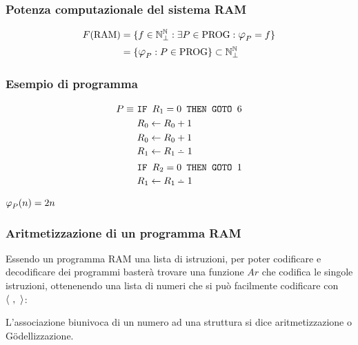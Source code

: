 \subsubsection*{Potenza computazionale del sistema RAM}
$$ \begin{aligned}
        F(\RAM) &= \{f\in\N_\perp^\N:\exists P \in \PROG: \semantica_P=f\}\\
                &= \{\semantica_P:P\in\PROG\} \subset \N_\perp^\N
\end{aligned} $$

\subsubsection*{Esempio di programma}
\vspace{-1em}
\begin{minipage}{.48\textwidth}
    \begin{align}
        P \equiv\ & \goto{R_1}{6}       \notag\\
        & R_0 \leftarrow R_0+1          \notag\\
        & R_0 \leftarrow R_0+1          \notag\\[-.3em]
        & R_1 \leftarrow R_1\dotminus 1 \notag\\
        & \goto{R_2}{1}                 \notag\\[-.3em]
        & R_1 \leftarrow R_1\dotminus 1 \notag
    \end{align}
\end{minipage}
\begin{minipage}{.48\textwidth}
    $ \semantica_P(n) = 2n $
\end{minipage}

\subsubsection*{Aritmetizzazione di un programma RAM}
Essendo un programma RAM una lista di istruzioni, per poter codificare e decodificare
dei programmi basterà trovare una funzione $Ar$ che codifica le singole istruzioni, 
ottenenendo una lista di numeri che si può facilmente codificare con $\cantor{\ ,\ }$:
\begin{figure}[H]
    \centering
    
\end{figure}

L'associazione biunivoca di un numero ad una struttura si dice aritmetizzazione o
Gödellizzazione.


